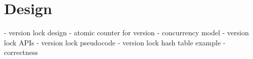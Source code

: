 \section{Design}
\label{s:des}

- version lock design 
	- atomic counter for version
	- concurrency model
	- version lock APIs
- version lock pseudocode
- version lock hash table example
- correctness

